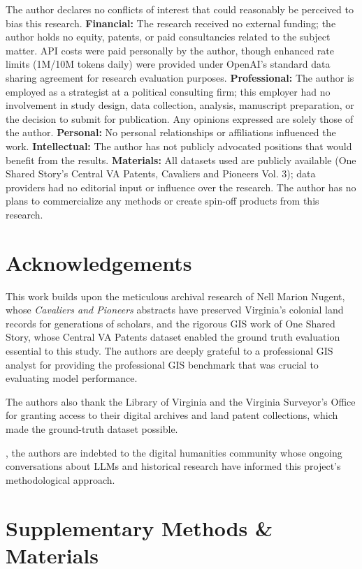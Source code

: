 The author declares no conflicts of interest that could reasonably be
perceived to bias this research. \textbf{Financial:} The research
received no external funding; the author holds no equity, patents, or
paid consultancies related to the subject matter. API costs were paid
personally by the author, though enhanced rate limits (1M/10M tokens
daily) were provided under OpenAI's standard data sharing agreement for
research evaluation purposes. \textbf{Professional:} The author is
employed as a strategist at a political consulting firm; this employer
had no involvement in study design, data collection, analysis,
manuscript preparation, or the decision to submit for publication. Any
opinions expressed are solely those of the author. \textbf{Personal:} No
personal relationships or affiliations influenced the work.
\textbf{Intellectual:} The author has not publicly advocated positions
that would benefit from the results. \textbf{Materials:} All datasets
used are publicly available (One Shared Story's Central VA Patents,
Cavaliers and Pioneers Vol. 3); data providers had no editorial input or
influence over the research. The author has no plans to commercialize
any methods or create spin-off products from this research.

\section{Acknowledgements}\label{acknowledgements}

This work builds upon the meticulous archival research of Nell Marion
Nugent, whose \emph{Cavaliers and Pioneers} abstracts have preserved
Virginia's colonial land records for generations of scholars, and the
rigorous GIS work of One Shared Story, whose Central VA Patents dataset
enabled the ground truth evaluation essential to this study. The authors
are deeply grateful to a professional GIS analyst \citep{Bashorun2025_gis} for
providing the professional GIS benchmark that was crucial to evaluating
model performance.

The authors also thank the Library of Virginia and the Virginia
Surveyor's Office for granting access to their digital archives and land
patent collections, which made the ground-truth dataset possible.

\appendixFinally, the authors are indebted to the digital humanities community
whose ongoing conversations about LLMs and historical research have
informed this project's methodological approach.


\section{Supplementary Methods \&
Materials}\label{appendix-a-supplementary-methods-materials}

